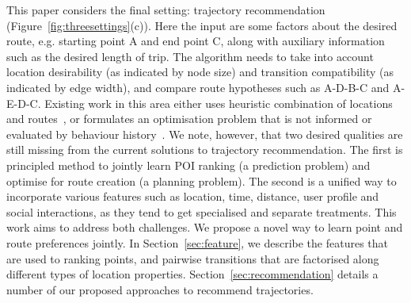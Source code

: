 This paper considers the final setting: trajectory recommendation (Figure~\ref{fig:threesettings}(c)). Here the input are some factors about the desired route, e.g. starting point A and end point C, along with auxiliary information such as the desired length of trip. The algorithm needs to take into account location desirability (as indicated by node size) and transition compatibility (as indicated by edge width), and compare route hypotheses such as A-D-B-C and A-E-D-C. Existing work in this area either uses heuristic combination of locations and routes~\cite{lu2010photo2trip,ijcai15,lu2012personalized}, or formulates an optimisation problem that is not informed or evaluated by behaviour history~\cite{gioniswsdm14,chen2015tripplanner}.
%
We note, however, that two desired qualities are still
missing from the current solutions to trajectory recommendation.
The first is principled method to jointly learn POI ranking (a prediction problem)
and optimise for route creation (a planning problem).
The second is a unified way to incorporate various features
such as location, time, distance, user profile and social interactions,
as they tend to get specialised and separate treatments.
This work aims to address both challenges. %
We propose a novel way to learn point and route preferences jointly.
In Section~\ref{sec:feature}, we describe the features that are used to ranking points,
and pairwise transitions that are factorised along %
different types of location properties.
Section~\ref{sec:recommendation} details a number of our proposed approaches to recommend trajectories.
